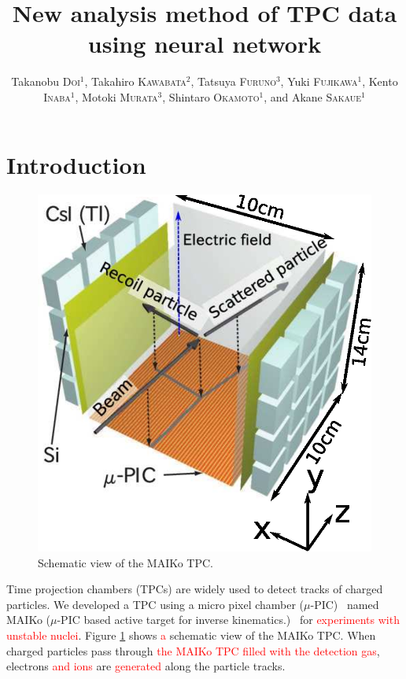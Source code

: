 \documentclass{jps-cp}
\title{New analysis method of TPC data using neural network}
\author{
  Takanobu \textsc{Doi}$^{1}$, Takahiro \textsc{Kawabata}$^{2}$, Tatsuya \textsc{Furuno}$^{3}$,
  Yuki \textsc{Fujikawa}$^{1}$, Kento \textsc{Inaba}$^{1}$, Motoki \textsc{Murata}$^{3}$,
  Shintaro \textsc{Okamoto}$^{1}$, and Akane \textsc{Sakaue}$^{1}$}
\begin{document}
\maketitle

\section{Introduction}
\begin{figure}
  \vspace{0zw}
  \centering
  \includegraphics[clip, width=15zw]{eps/MAIKo_v2.eps}
  \caption{Schematic view of the MAIKo TPC.}
  \label{fig:MAIKo}
  \vspace{-2zw}
\end{figure}
Time projection chambers (TPCs) are widely used to detect tracks of charged particles.
We developed a TPC using a micro pixel chamber ($\mu$-PIC)~\cite{mupic} named
MAIKo ($\mu$-PIC based active target for inverse kinematics.)~\cite{MAIKo}
for \textcolor{red}{experiments with unstable nuclei}.
Figure \ref{fig:MAIKo} shows \textcolor{red}{a} schematic view of the MAIKo TPC.
When charged particles pass through \textcolor{red}{the MAIKo TPC filled with the detection gas},
electrons \textcolor{red}{and ions} are \textcolor{red}{generated} along the particle tracks.
\end{document}
